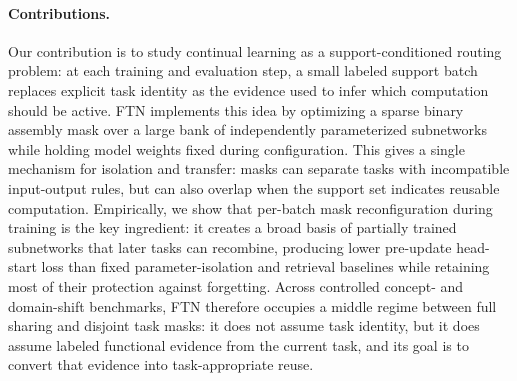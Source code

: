 \documentclass{article}
\begin{document}
\paragraph{Contributions.}
Our contribution is to study continual learning as a support-conditioned routing problem: at each training and evaluation step, a small labeled support batch replaces explicit task identity as the evidence used to infer which computation should be active. FTN implements this idea by optimizing a sparse binary assembly mask over a large bank of independently parameterized subnetworks while holding model weights fixed during configuration. This gives a single mechanism for isolation and transfer: masks can separate tasks with incompatible input-output rules, but can also overlap when the support set indicates reusable computation. Empirically, we show that per-batch mask reconfiguration during training is the key ingredient: it creates a broad basis of partially trained subnetworks that later tasks can recombine, producing lower pre-update head-start loss than fixed parameter-isolation and retrieval baselines while retaining most of their protection against forgetting. Across controlled concept- and domain-shift benchmarks, FTN therefore occupies a middle regime between full sharing and disjoint task masks: it does not assume task identity, but it does assume labeled functional evidence from the current task, and its goal is to convert that evidence into task-appropriate reuse.

\end{document}
